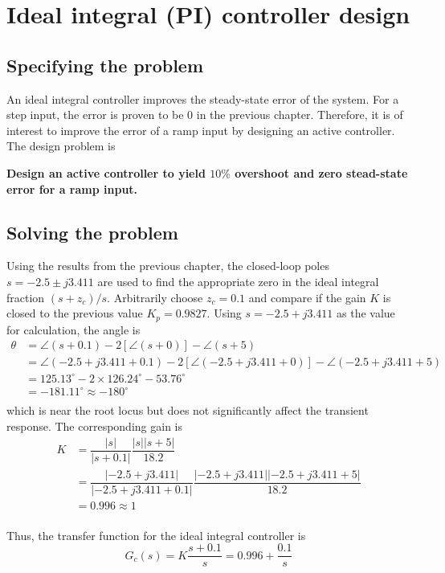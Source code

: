 \chapter{Ideal integral (PI) controller design}

\section{Specifying the problem}
An ideal integral controller improves the steady-state error of the system. For a step input, the error is proven to be 0 in the previous chapter. Therefore, it is of interest to improve the error of a ramp input by designing an active controller. The design problem is

\textbf{Design an active controller to yield $ 10\% $ overshoot and zero stead-state error for a ramp input.}

\section{Solving the problem}
Using the results from the previous chapter, the closed-loop poles $ s = -2.5 \pm j3.411 $ are used to find the appropriate zero in the ideal integral fraction $ (s+z_c)/s $. Arbitrarily choose $ z_c = 0.1 $ and compare if the gain $ K $ is closed to the previous value $ K_p = 0.9827 $. Using $ s = -2.5 + j3.411 $ as the value for calculation, the angle is
\[
\begin{array}{ll}
\theta & = \angle (s+0.1) - 2[\angle (s+0)] - \angle (s+5)\\
& = \angle (-2.5+j3.411+0.1) - 2[\angle (-2.5+j3.411+0)] - \angle (-2.5+j3.411+5)\\
& = 125.13^\circ - 2\times 126.24^\circ - 53.76^\circ\\
& = -181.11^\circ \approx -180^\circ\\
\end{array}
\]
which is near the root locus but does not significantly affect the transient response. The corresponding gain is
\[
\begin{array}{ll}
K & = \dfrac{|s|}{|s+0.1|}\dfrac{|s||s+5|}{18.2}\\
& = \dfrac{|-2.5 + j3.411|}{|-2.5 + j3.411+0.1|}\dfrac{|-2.5 + j3.411||-2.5 + j3.411+5|}{18.2} \\
& = 0.996 \approx 1\\
\end{array}
\]

Thus, the transfer function for the ideal integral controller is
\begin{equation}
	G_c(s) = K\dfrac{s+0.1}{s} = 0.996 + \dfrac{0.1}{s}
\end{equation}

